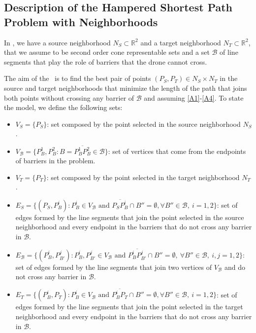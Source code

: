 \documentclass[a4paper]{elsarticle}
\newcommand{\SPPN}{{\sf{H-SPPN}\xspace }}
\newcommand{\B}{{\mathcal B}}
\newcommand{\VB}{{V^{}_{\mathcal B}}}
\newcommand{\EB}{{E^{}_{\mathcal B}}}
\newcommand{\VS}{{V^{}_{S}}}
\newcommand{\ES}{{E^{}_{S}}}
\newcommand{\VT}{{V^{}_{T}}}
\newcommand{\ET}{{E^{}_{T}}}
\begin{document}
	\subsection{Description of the Hampered Shortest Path Problem with Neighborhoods}\label{subsection:descriptionHSPPN}
	In \SPPN, we have a source neighborhood $N_S\subset\mathbb R^2$ and a target neighborhood $N_T\subset\mathbb R^2$, that we assume to be second order cone representable sets and a set $\mathcal B$ of line segments that play the role of barriers that the drone cannot cross. 
	
	The aim of the \SPPN \ is to find the best pair of points $(P_{S}, P_{T})\in N_S\times N_T$ in the source and target neighborhoods that minimize the length of the path that joins both points without crossing any barrier of $\mathcal B$ and assuming \ref{A1}-\ref{A4}. To state the model,  we define the following sets:
	\begin{itemize}
		\item $\VS=\{P_S\}$: set composed by the point selected in the source neighborhood $N_S$.
		\item $\VB=\{P^1_B, P^2_B:B=\overline{P^1_B P^2_B}\in \mathcal B\}$: set of vertices that come from the endpoints of barriers in the problem.
		\item $\VT=\{P^{}_T\}$: set composed by the point selected in the target neighborhood $N_T$.
		\item $\ES=\{(P_S, P^i_{B}):P^i_B\in V_\B\text{ and } \overline{P_SP^i_B}\cap B''=\emptyset,\forall B''\in\B,\:i=1,2\}$: set of edges formed by the line segments that join the point selected in the source neighborhood and every endpoint in the barriers that do not cross any barrier in $\B$.
		\item $\EB=\{(P^{i}_B, P^{j}_{B'}):P^i_B, P^j_{B'}\in \VB \text{ and } \overline{P^i_B P^j_{B'}}\cap B''=\emptyset,\:\forall B''\in\mathcal B,\:i, j=1,2\}$: set of edges formed by the line segments that join two vertices of $V_{\mathcal B}$ and do not cross any barrier in $\B$.
		\item $\ET=\{(P^i_{B}, P^{}_T):P^i_B\in V_\B\text{ and } \overline{P^i_BP^{}_T}\cap B''=\emptyset,\forall B''\in\B,\:i=1,2\}$: set of edges formed by the line segments that join the point selected in the target neighborhood and every endpoint in the barriers that do not cross any barrier in $\B$.
	\end{itemize} 
	
\end{document}
